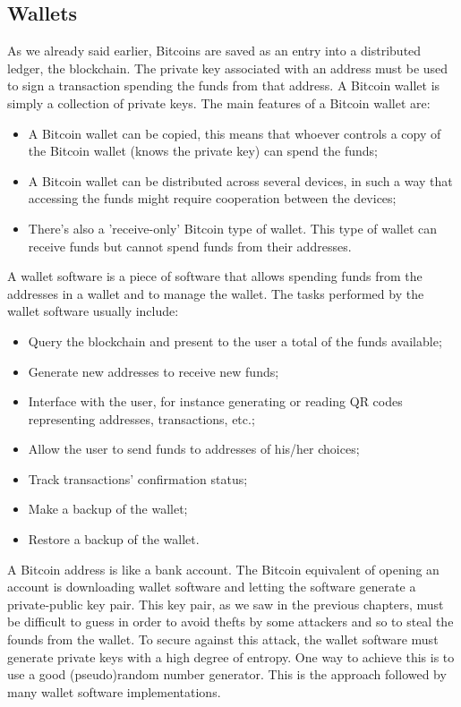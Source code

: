 \documentclass{article}
\begin{document}
\subsection*{Wallets}
As we already said earlier, Bitcoins are saved as an entry into a distributed ledger, the blockchain. The private key associated with an address must be used to sign a transaction spending the funds from that address. A Bitcoin wallet is simply a collection of private keys. The main features of a Bitcoin wallet are:
\begin{itemize}
    \item A Bitcoin wallet can be copied, this means that whoever controls a copy of the Bitcoin wallet (knows the private key) can spend the funds;
    \item A Bitcoin wallet can be distributed across several devices, in such a way that accessing the funds might require cooperation between the devices;
    \item There’s also a ’receive-only’ Bitcoin type of wallet. This type of wallet can receive funds but cannot spend funds from their addresses.
\end{itemize}
A wallet software is a piece of software that allows spending funds from the addresses in a wallet and to manage the wallet. The tasks performed by the wallet software usually include:
\begin{itemize}
    \item Query the blockchain and present to the user a total of the funds available;
    \item Generate new addresses to receive new funds;
    \item Interface with the user, for instance generating or reading QR codes
representing addresses, transactions, etc.;
    \item Allow the user to send funds to addresses of his/her choices;
    \item Track transactions’ confirmation status;
    \item Make a backup of the wallet;
    \item Restore a backup of the wallet.
\end{itemize}
A Bitcoin address is like a bank account. The Bitcoin equivalent of opening an account is downloading wallet software and letting the software generate a private-public key pair. This key pair, as we saw in the previous chapters, must be difficult to guess in order to avoid thefts by some attackers and so to steal the founds from the wallet. To secure against this attack, the wallet software must generate private keys with a high degree of entropy. One way to achieve this is to use a good (pseudo)random number generator. This is the approach followed by many wallet software implementations.\newline
\end{document}
